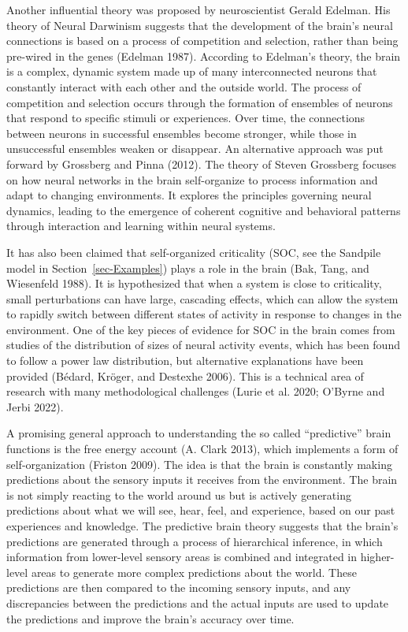 \documentclass[
  a4paper,
  DIV=11,
  numbers=noendperiod,
  oneside]{scrreprt}
\begin{document}
Another influential theory was proposed by neuroscientist Gerald
Edelman. His theory of Neural Darwinism suggests that the development of
the brain's neural connections is based on a process of competition and
selection, rather than being pre-wired in the genes (Edelman 1987).
According to Edelman's theory, the brain is a complex, dynamic system
made up of many interconnected neurons that constantly interact with
each other and the outside world. The process of competition and
selection occurs through the formation of ensembles of neurons that
respond to specific stimuli or experiences. Over time, the connections
between neurons in successful ensembles become stronger, while those in
unsuccessful ensembles weaken or disappear. An alternative approach was
put forward by Grossberg and Pinna (2012). The theory of Steven
Grossberg focuses on how neural networks in the brain self-organize to
process information and adapt to changing environments. It explores the
principles governing neural dynamics, leading to the emergence of
coherent cognitive and behavioral patterns through interaction and
learning within neural systems.

It has also been claimed that self-organized criticality (SOC, see the
Sandpile model in Section~\ref{sec-Examples}) plays a role in the brain
(Bak, Tang, and Wiesenfeld 1988). It is hypothesized that when a system
is close to criticality, small perturbations can have large, cascading
effects, which can allow the system to rapidly switch between different
states of activity in response to changes in the environment. One of the
key pieces of evidence for SOC in the brain comes from studies of the
distribution of sizes of neural activity events, which has been found to
follow a power law distribution, but alternative explanations have been
provided (Bédard, Kröger, and Destexhe 2006). This is a technical area
of research with many methodological challenges (Lurie et al. 2020;
O'Byrne and Jerbi 2022).

A promising general approach to understanding the so called
``predictive'' brain functions is the free energy account (A. Clark
2013), which implements a form of self-organization (Friston 2009). The
idea is that the brain is constantly making predictions about the
sensory inputs it receives from the environment. The brain is not simply
reacting to the world around us but is actively generating predictions
about what we will see, hear, feel, and experience, based on our past
experiences and knowledge. The predictive brain theory suggests that the
brain's predictions are generated through a process of hierarchical
inference, in which information from lower-level sensory areas is
combined and integrated in higher-level areas to generate more complex
predictions about the world. These predictions are then compared to the
incoming sensory inputs, and any discrepancies between the predictions
and the actual inputs are used to update the predictions and improve the
brain's accuracy over time.
\end{document}
